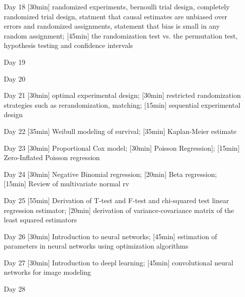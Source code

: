 \begin{enumerate}
\item[Day 18] [30min] randomized experiments, bernoulli trial design, completely randomized trial design, statment that causal estimates are unbiased over errors and randomized assignments, statement that bias is small in any random assignment; [45min] the randomization test vs. the permutation test, hypothesis testing and confidence intervals

\item[Day 19] 
\item[Day 20] 

\item[Day 21] [30min] optimal experimental design; [30min] restricted randomization strategies such as rerandomization, matching; [15min] sequential experimental design

\item[Day 22] [35min] Weibull modeling of survival; [35min] Kaplan-Meier estimate

\item[Day 23] [30min] Proportional Cox model; [30min] Poisson Regression]; [15min] Zero-Inflated Poisson regression

\item[Day 24] [30min] Negative Binomial regression; [20min] Beta regression; [15min] Review of multivariate normal rv

\item[Day 25] [55min] Derivation of T-test and F-test and chi-squared test linear regression estimator; [20min] derivation of variance-covariance matrix of the least squared estimators

\item[Day 26] [30min] Introduction to neural networks; [45min] estimation of parameters in neural networks using optimization algorithms

\item[Day 27] [30min] Introduction to deepl learning; [45min] convolutional neural networks for image modeling

\item[Day 28] 

\end{enumerate}

